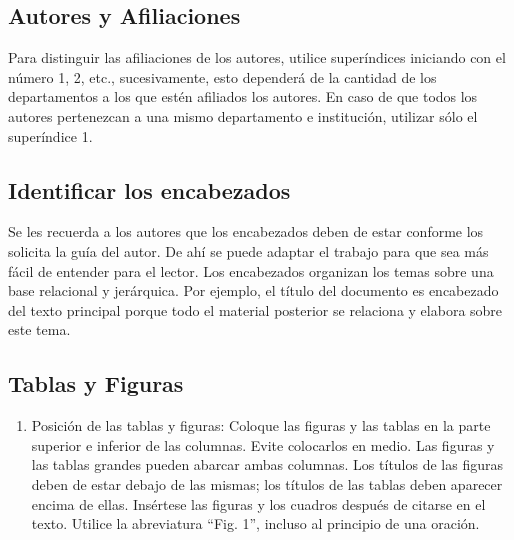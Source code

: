     
    
    \subsection{Autores y Afiliaciones}
    
        Para distinguir las afiliaciones de los autores, utilice superíndices iniciando con el número 1, 2, etc., sucesivamente, esto dependerá de la cantidad de los departamentos a los que estén afiliados los autores. En caso de que todos los autores pertenezcan a una mismo departamento e institución, utilizar sólo el superíndice 1. 


    
    
    \subsection{Identificar los encabezados}
    
        Se les recuerda a los autores que los encabezados deben de estar conforme los solicita la guía del autor. De ahí se puede adaptar el trabajo para que sea más fácil de entender para el lector.
        Los encabezados organizan los temas sobre una base relacional y jerárquica. Por ejemplo, el título del documento es encabezado del texto principal porque todo el material posterior se relaciona y elabora sobre este tema. 


   
    
    \subsection{Tablas y Figuras}
    
        \begin{enumerate}
            \item Posición de las tablas y figuras: Coloque las figuras y las tablas en la parte superior e inferior de las columnas. Evite colocarlos en medio. Las figuras y las tablas grandes pueden abarcar ambas columnas. Los títulos de las figuras deben de estar debajo de las mismas; los títulos de las tablas deben aparecer encima de ellas. Insértese las figuras y los cuadros después de citarse en el texto. Utilice la abreviatura “Fig. 1”, incluso al principio de una oración. 
        \end{enumerate}


